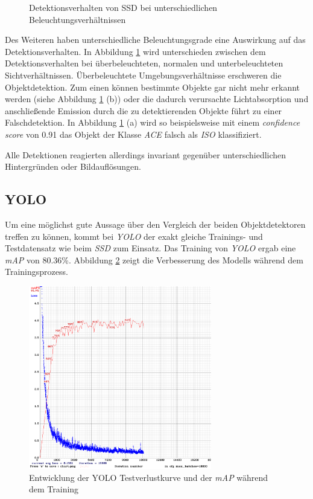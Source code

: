 \begin{figure}[H]
	\caption{Detektionsverhalten von SSD bei unterschiedlichen Beleuchtungsverhältnissen}
	\label{sicht}
\end{figure}

Des Weiteren haben unterschiedliche Beleuchtungsgrade eine Auswirkung auf das Detektionsverhalten. In Abbildung \ref{sicht} wird unterschieden zwischen dem Detektionsverhalten bei überbeleuchteten, normalen und unterbeleuchteten Sichtverhältnissen. Überbeleuchtete Umgebungsverhältnisse erschweren die Objektdetektion. Zum einen können bestimmte Objekte gar nicht mehr erkannt werden (siehe Abbildung \ref{sicht} (b)) oder die dadurch verursachte Lichtabsorption und anschließende Emission durch die zu detektierenden Objekte führt zu einer Falschdetektion. In Abbildung \ref{sicht} (a) wird so beispielsweise mit einem \textit{confidence score} von 0.91 das Objekt der Klasse \textit{ACE} falsch als \textit{ISO} klassifiziert.

Alle Detektionen reagierten allerdings invariant gegenüber unterschiedlichen Hintergründen oder Bildauflösungen.

\subsection*{YOLO}

Um eine möglichst gute Aussage über den Vergleich der beiden Objektdetektoren treffen zu können, kommt bei \textit{YOLO} der exakt gleiche Trainings- und Testdatensatz wie beim \textit{SSD} zum Einsatz. Das Training von \textit{YOLO} ergab eine \textit{mAP} von 80.36\%. Abbildung \ref{yolo_result} zeigt die Verbesserung des Modells während dem Trainingsprozess. 

\begin{figure}[H]
	\begin{center}
		\includegraphics[width=8cm]{Bilder/yolo_result.png} 
		\caption{Entwicklung der YOLO Testverlustkurve und der \textit{mAP} während dem Training}
		\label{yolo_result}
	\end{center}
\end{figure}


